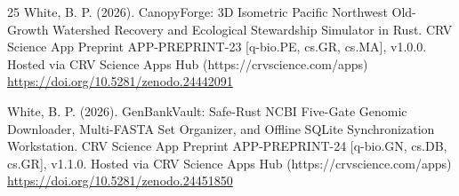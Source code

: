 \documentclass[10pt,letterpaper]{article}
\begin{document}
\begin{thebibliography}{25}
 White, B. P. (2026). CanopyForge: 3D Isometric Pacific Northwest Old-Growth Watershed Recovery and Ecological Stewardship Simulator in Rust. CRV Science App Preprint APP-PREPRINT-23 [q-bio.PE, cs.GR, cs.MA], v1.0.0. Hosted via CRV Science Apps Hub (https://crvscience.com/apps) \url{https://doi.org/10.5281/zenodo.24442091}

 White, B. P. (2026). GenBankVault: Safe-Rust NCBI Five-Gate Genomic Downloader, Multi-FASTA Set Organizer, and Offline SQLite Synchronization Workstation. CRV Science App Preprint APP-PREPRINT-24 [q-bio.GN, cs.DB, cs.GR], v1.1.0. Hosted via CRV Science Apps Hub (https://crvscience.com/apps) \url{https://doi.org/10.5281/zenodo.24451850}
\end{thebibliography}
\end{document}
